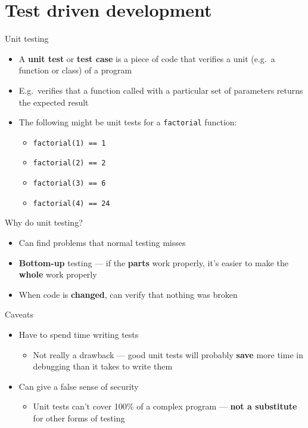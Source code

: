 \part{Test driven development}
\frame{\partpage}

\begin{frame}[fragile]{Unit testing}
    \begin{itemize}
        \item A \textbf{unit test} or \textbf{test case} is a piece of code that verifies a unit (e.g.\ a function or class) of a program \pause
        \item E.g.\ verifies that a function called with a particular set of parameters returns the expected result \pause
        \item The following might be unit tests for a \lstinline!factorial! function:
        \begin{itemize}
            \item \lstinline!factorial(1) == 1!
            \item \lstinline!factorial(2) == 2!
            \item \lstinline!factorial(3) == 6!
            \item \lstinline!factorial(4) == 24!
        \end{itemize}
    \end{itemize}
\end{frame}

\begin{frame}{Why do unit testing?}
    \begin{itemize}
        \item Can find problems that normal testing misses \pause
        \item \textbf{Bottom-up} testing --- if the \textbf{parts} work properly, it's easier to make the \textbf{whole} work properly \pause
        \item When code is \textbf{changed}, can verify that nothing was broken
    \end{itemize}
\end{frame}

\begin{frame}{Caveats}
    \begin{itemize}
        \item Have to spend time writing tests \pause
            \begin{itemize}
                \item Not really a drawback --- good unit tests will probably \textbf{save} more time in debugging than it takes to write them \pause
            \end{itemize}
        \item Can give a false sense of security \pause
            \begin{itemize}
                \item Unit tests can't cover 100\% of a complex program --- \textbf{not a substitute} for other forms of testing
            \end{itemize}
    \end{itemize}
\end{frame}

